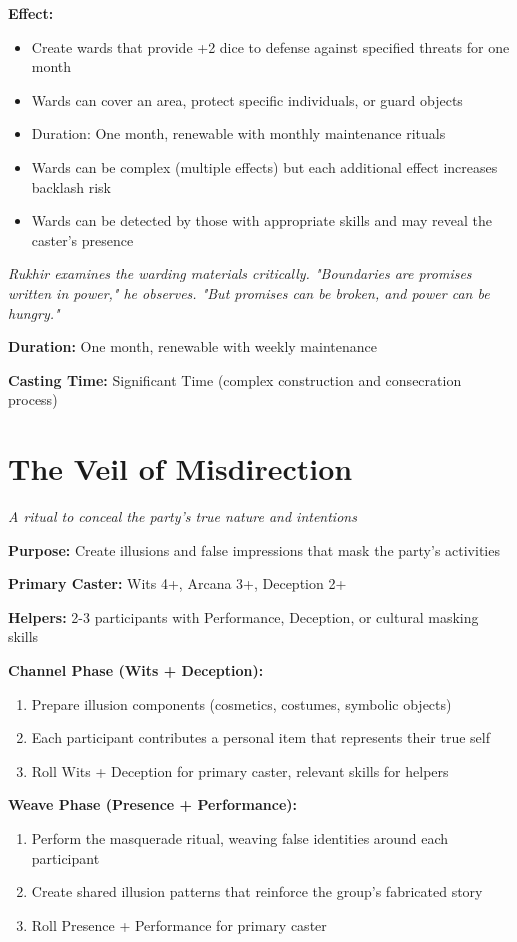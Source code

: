 \documentclass[12pt,twoside]{book}
\newcommand{\shadow}[1]{\textit{#1}}
\begin{document}
\textbf{Effect:}
\begin{itemize}
\item Create wards that provide +2 dice to defense against specified threats for one month
\item Wards can cover an area, protect specific individuals, or guard objects
\item Duration: One month, renewable with monthly maintenance rituals
\item Wards can be complex (multiple effects) but each additional effect increases backlash risk
\item Wards can be detected by those with appropriate skills and may reveal the caster's presence
\end{itemize}

\shadow{Rukhir examines the warding materials critically. "Boundaries are promises written in power," he observes. "But promises can be broken, and power can be hungry."}

\textbf{Duration:} One month, renewable with weekly maintenance

\textbf{Casting Time:} Significant Time (complex construction and consecration process)

\section*{The Veil of Misdirection}
\textit{A ritual to conceal the party's true nature and intentions}

\textbf{Purpose:} Create illusions and false impressions that mask the party's activities

\textbf{Primary Caster:} Wits 4+, Arcana 3+, Deception 2+

\textbf{Helpers:} 2-3 participants with Performance, Deception, or cultural masking skills

\textbf{Channel Phase (Wits + Deception):}
\begin{enumerate}
\item Prepare illusion components (cosmetics, costumes, symbolic objects)
\item Each participant contributes a personal item that represents their true self
\item Roll Wits + Deception for primary caster, relevant skills for helpers
\end{enumerate}

\textbf{Weave Phase (Presence + Performance):}
\begin{enumerate}
\item Perform the masquerade ritual, weaving false identities around each participant
\item Create shared illusion patterns that reinforce the group's fabricated story
\item Roll Presence + Performance for primary caster
\end{enumerate}
\end{document}
